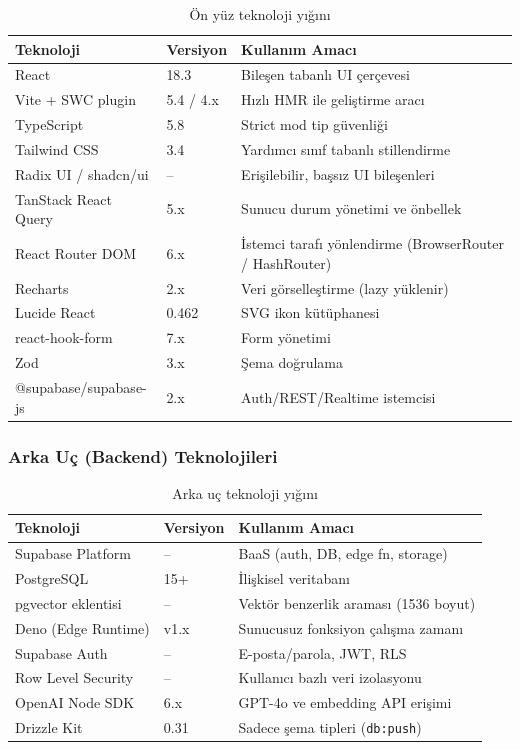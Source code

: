 \begin{table}[H]
\centering
\caption{Ön yüz teknoloji yığını}
\label{tab:frontend_stack}
\begin{tabular}{|l|l|l|}
\hline
\textbf{Teknoloji} & \textbf{Versiyon} & \textbf{Kullanım Amacı} \\
\hline
React              & 18.3 & Bileşen tabanlı UI çerçevesi~\cite{React2024} \\
Vite + SWC plugin  & 5.4 / 4.x & Hızlı HMR ile geliştirme aracı \\
TypeScript         & 5.8 & Strict mod tip güvenliği \\
Tailwind CSS       & 3.4 & Yardımcı sınıf tabanlı stillendirme \\
Radix UI / shadcn/ui & --   & Erişilebilir, başsız UI bileşenleri \\
TanStack React Query & 5.x & Sunucu durum yönetimi ve önbellek \\
React Router DOM    & 6.x & İstemci tarafı yönlendirme (BrowserRouter / HashRouter) \\
Recharts            & 2.x & Veri görselleştirme (lazy yüklenir) \\
Lucide React        & 0.462 & SVG ikon kütüphanesi \\
react-hook-form     & 7.x & Form yönetimi \\
Zod                 & 3.x & Şema doğrulama \\
@supabase/supabase-js & 2.x & Auth/REST/Realtime istemcisi \\
\hline
\end{tabular}
\end{table}

\subsubsection{Arka Uç (Backend) Teknolojileri}

\begin{table}[H]
\centering
\caption{Arka uç teknoloji yığını}
\label{tab:backend_stack}
\begin{tabular}{|l|l|l|}
\hline
\textbf{Teknoloji} & \textbf{Versiyon} & \textbf{Kullanım Amacı} \\
\hline
Supabase Platform   & --    & BaaS (auth, DB, edge fn, storage)~\cite{Supabase2024} \\
PostgreSQL          & 15+   & İlişkisel veritabanı~\cite{PostgreSQL2024} \\
pgvector eklentisi  & --    & Vektör benzerlik araması (1536 boyut) \\
Deno (Edge Runtime) & v1.x  & Sunucusuz fonksiyon çalışma zamanı \\
Supabase Auth       & --    & E-posta/parola, JWT, RLS \\
Row Level Security  & --    & Kullanıcı bazlı veri izolasyonu \\
OpenAI Node SDK     & 6.x   & GPT-4o ve embedding API erişimi \\
Drizzle Kit         & 0.31  & Sadece şema tipleri (\texttt{db:push}) \\
\hline
\end{tabular}
\end{table}

